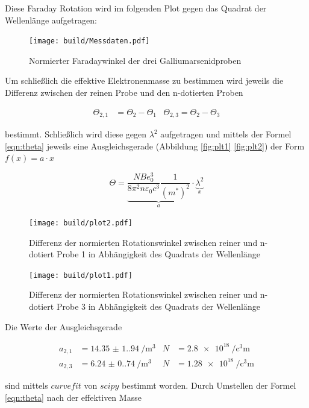 Diese Faraday Rotation wird im folgenden Plot gegen das Quadrat der Wellenlänge aufgetragen: 

\begin{figure}[H]
	\centering
	\texttt{[image: build/Messdaten.pdf]}
	\caption{Normierter Faradaywinkel der drei Galliumarsenidproben}\label{fig:Aufbau}
\end{figure}

Um schließlich die effektive Elektronenmasse zu bestimmen wird jeweils die Differenz zwischen der reinen Probe und den n-dotierten Proben

\begin{align*}
    \Theta_{2,1}&=\Theta_2-\Theta_1  & \Theta_{2,3}=\Theta_2-\Theta_3
\end{align*}

bestimmt.
Schließlich wird diese gegen $\lambda^2$ aufgetragen und 
mittels der Formel \eqref{eqn:theta} jeweils eine Ausgleichsgerade (Abbildung \eqref{fig:plt1} \eqref{fig:plt2}) der Form $f(x)=a\cdot x$

\begin{equation}
    \Theta=\underbrace{\frac{NBe_0^3}{8 \pi^2 n \varepsilon_0 c^3} \frac{1}{(m^{\ast})^2}}_{a} \cdot \underbrace{\lambda^2}_{x}
    \label{eqn:theta}
\end{equation}

\begin{figure}[H]
	\centering
	\texttt{[image: build/plot2.pdf]}
	\caption{Differenz der normierten Rotationswinkel zwischen reiner und n-dotiert Probe 1 in Abhängigkeit des Quadrats der Wellenlänge}\label{fig:plt1}
\end{figure}

\begin{figure}[H]
	\centering
	\texttt{[image: build/plot1.pdf]}
	\caption{Differenz der normierten Rotationswinkel zwischen reiner und n-dotiert Probe 3 in Abhängigkeit des Quadrats der Wellenlänge}\label{fig:plt2}
\end{figure}

Die Werte der Ausgleichsgerade 

\begin{align}
    a_{2,1}&=\qty{14.35(1.94)}{\per\cubic\meter} & N&=\qty{2.8e18}{\per\cubic\centi\meter}\\
    a_{2,3}&=\qty{6.24(0.74)}{\per\cubic\meter}  & N&=\qty{1.28e18}{\per\cubic\centi\meter}
\end{align}

sind mittels $curvefit$ von $scipy$ \cite{scipy} bestimmt worden.
Durch Umstellen der Formel \eqref{eqn:theta} nach der effektiven Masse

